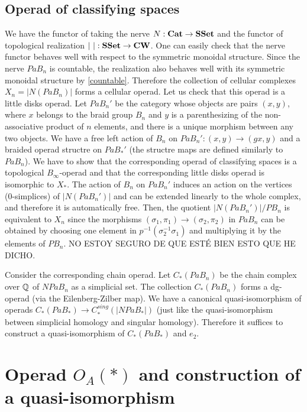 \documentclass[TFM.tex]{subfiles}
\begin{document}
\subsection{Operad of classifying spaces}

We have the functor of taking the nerve $N:\mathrm{\mathbf{Cat}}\to\mathrm{\mathbf{SSet}}$ and the functor of topological realization $|\ |:\mathrm{\mathbf{SSet}}\to \mathrm{\mathbf{CW}}$. One can easily check that the nerve functor behaves well with respect to the symmetric monoidal structure. Since the nerve $PaB_n$ is countable, the realization also behaves well with its symmetric monoidal structure by \ref{countable}. Therefore the collection of cellular complexes $X_n=|N(PaB_n)|$ forms a cellular operad. Let us check that this operad is a little disks operad. Let $PaB_n'$ be the category whose objects are pairs $(x,y)$, where $x$ belongs to the braid group $B_n$ and $y$ is a parenthesizing of the non-associative product of $n$ elements, and there is a unique morphism between any two objects. We have a free left action of $B_n$ on $PaB_n':(x,y)\to (gx,y)$ and a braided operad structre on $PaB_*'$ (the structre maps are defined similarly to $PaB_n$). We have to show that the corresponding operad of classifying spaces is a topological $B_\infty$-operad and that the corresponding little disks operad is isomorphic to $X_*$. The action of $B_n$ on $PaB_n'$ induces an action on the vertices (0-simplices) of $|N(PaB_n')|$ and can be extended linearly to the whole complex, and therefore it is automatically free. Then, the quotient $|N(PaB_n')|/PB_n$ is equivalent to $X_n$ since the morphisms $(\sigma_1,\pi_1)\to(\sigma_2,\pi_2)$ in $PaB_n$ can be obtained by choosing one element in $p^{-1}(\sigma_2^{-1}\sigma_1)$ and multiplying it by the elements of $PB_n$. NO ESTOY SEGURO DE QUE ESTÉ BIEN ESTO QUE HE DICHO.

Consider the corresponding chain operad. Let $C_*(PaB_n)$ be the chain complex over $\mathbb{Q}$ of $NPaB_n$ as a simplicial set. The collection $C_*(PaB_n)$ forms a dg-operad (via the Eilenberg-Zilber map). We have a canonical quasi-isomorphism of operads $C_*(PaB_*)\to C_*^{sing}(|NPaB_*|)$ (just like the quasi-isomorphism between simplicial homology and singular homology). Therefore it suffices to construct a quasi-isomorphism of $C_*(PaB_*)$ and $e_2$.

\section{Operad $O_A(*)$ and construction of a quasi-isomorphism}
\end{document}
